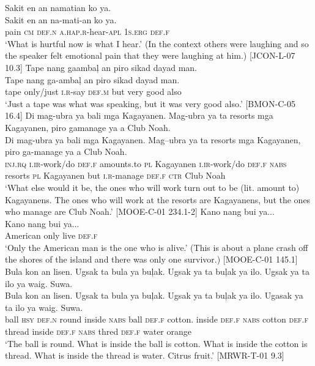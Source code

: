 \ea 
Sakit  en  an  namatian  ko  ya. \\\smallskip
\gll Sakit  en  an  na-mati-an  ko  ya. \\
pain  \textsc{cm}  \textsc{def.n}  \textsc{a.hap.r}-hear-\textsc{apl}  1\textsc{s.erg}  \textsc{def.f} \\
\glt ‘What is hurtful now is what I hear.’ (In the context others were laughing and so the speaker felt emotional pain that they were laughing at him.) [JCON-L-07 10.3]
\z
\ea 
Tape  nang  gaambaļ  an  piro  sikad  dayad  man. \\\smallskip
\gll Tape  nang  ga-ambaļ  an  piro  sikad  dayad  man. \\
tape  only/just  \textsc{i.r}-say  \textsc{def.m}  but  very  good  also \\
\glt ‘Just a tape was what was speaking, but it was very good also.’ [BMON-C-05 16.4]
\z
\ea 
 Di  mag-ubra  ya  bali  mga  Kagayanen.  Mag-ubra  ya  ta resorts  mga  Kagayanen,  piro  gamanage  ya  a  Club Noah. \\\smallskip
\gll Di  mag-ubra  ya  bali  mga  Kagayanen.  Mag--ubra  ya  ta resorts  mga  Kagayanen,  piro  ga-manage  ya  a  Club Noah. \\
\textsc{inj.rq}  \textsc{i.ir}-work/do  \textsc{def.f}  amounts.to  \textsc{pl}  Kagayanen  \textsc{i.ir}-work/do  \textsc{def.f}  \textsc{nabs}
resorts  \textsc{pl}  Kagayanen  but  \textsc{i.r}-manage  \textsc{def.f}  \textsc{ctr}  Club Noah \\
\glt `What else would it be, the ones who will work turn out to be (lit. amount to) Kagayanens. The ones who will work at the resorts are Kagayanens, but the ones who manage are Club Noah.’ [MOOE-C-01 234.1-2]
\z
\ea 
Kano  nang  bui  ya... \\\smallskip
\gll Kano  nang  bui  ya... \\
American  only  live  \textsc{def.f} \\
\glt ‘Only the American man is the one who is alive.’ (This is about a plane crash off the shores of the island and there was only one survivor.) [MOOE-C-01 145.1]
\z
\ea 
Bula  kon  an  lisen.  Ugsak  ta  bula  ya  buļak.  Ugsak  ya  ta buļak  ya  ilo.  Ugsak  ya  ta  ilo  ya  waig.  Suwa. \\\smallskip
\gll Bula  kon  an  lisen.  Ugsak  ta  bula  ya  buļak.  Ugsak  ya  ta buļak  ya  ilo.  Ugasak  ya  ta  ilo  ya  waig.  Suwa. \\
ball  \textsc{hsy}  \textsc{def.n}  round  inside  \textsc{nabs}  ball  \textsc{def.f}  cotton.  inside  \textsc{def.f}  \textsc{nabs}
cotton  \textsc{def.f}  thread  inside  \textsc{def.f}  \textsc{nabs}  thred  \textsc{def.f}  water  orange \\
\glt `The ball is round. What is inside the ball is cotton. What is inside the cotton is thread. What is inside the thread is water. Citrus fruit.’ [MRWR-T-01 9.3]
\z

